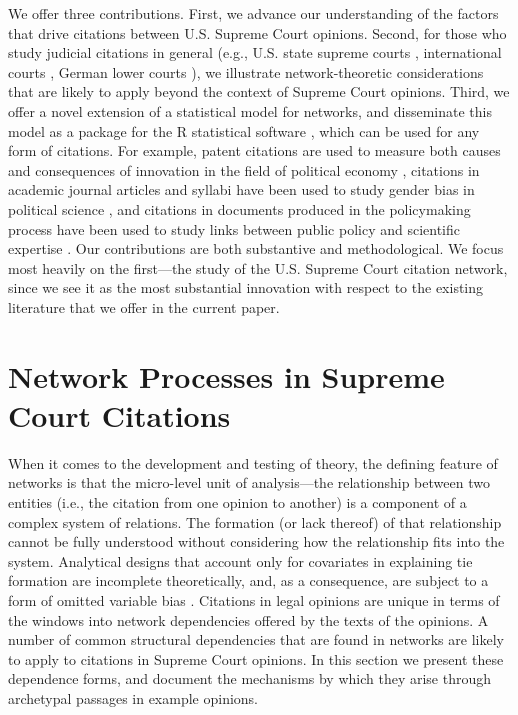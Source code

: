 \documentclass[headsepline=true, abstracton]{scrartcl}
\begin{document}
We offer three contributions. First, we advance our understanding of the factors that drive citations between U.S. Supreme Court opinions. Second, for those who study judicial citations in general (e.g., U.S. state supreme courts \citep{hinkle2016transmission}, international courts \citep{lupu2012precedent},  German lower courts \citep{berlemann2020disposition}), we illustrate network-theoretic considerations that are likely to apply beyond the context of Supreme Court opinions. Third, we offer a novel extension of a statistical model for networks, and disseminate this model as a package for the R statistical software \citep{cergm}, which can be used for any form of citations. For example, patent citations are used to measure both causes and consequences of innovation in the field of political economy \citep{akcigit2018growth,dincer2019does}, citations in academic journal articles and syllabi have been used to study gender bias in political science  \citep{dion2018gendered,maliniak2013gender,hardt2019gender,atchison2017negating}, and citations in documents produced in the policymaking process have been used to study links between public policy and scientific expertise \citep{costa2016science,koontz2018use,pattyn2020knowledge}. Our contributions are both substantive and methodological. We focus most heavily on the first---the study of the U.S. Supreme Court citation network, since we see it as the most substantial innovation with respect to the existing literature that we offer in the current paper.

\section{Network Processes in Supreme Court Citations} 

When it comes to the development and testing of theory, the defining feature of networks is that the micro-level unit of analysis---the relationship between two entities (i.e., the citation from one opinion to another) is a component of a complex system of relations. The formation (or lack thereof) of that relationship cannot be fully understood without considering how the relationship fits into the system. Analytical designs that account only for covariates in explaining tie formation are incomplete theoretically, and, as a consequence, are subject to a form of omitted variable bias \citep{cranmer2016critique}. Citations in legal opinions are unique in terms of the windows into network dependencies offered by the texts of the opinions. A number of common structural dependencies that are found in networks are likely to apply to citations in Supreme Court opinions. In this section we present these dependence forms, and document the mechanisms by which they arise through archetypal passages in example opinions. 
\end{document}
